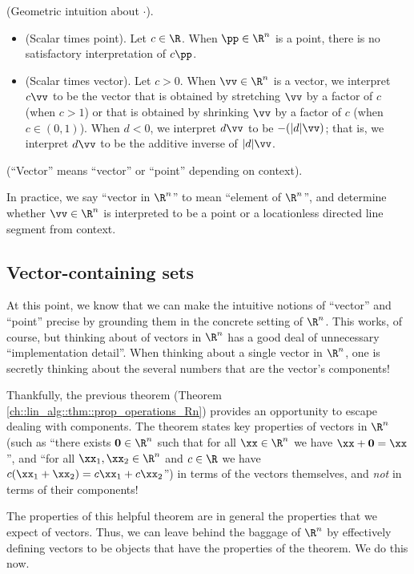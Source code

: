 \begin{remark}
    (Geometric intuition about $\cdot$).
    \begin{itemize}
        \item (Scalar times point). Let $c \in \R$. When $\pp \in \R^n$ is a point, there is no satisfactory interpretation of $c \pp$.
        \item (Scalar times vector). Let $c > 0$. When $\vv \in \R^n$ is a vector, we interpret $c \vv$ to be the vector that is obtained by stretching $\vv$ by a factor of $c$ (when $c > 1$) or that is obtained by shrinking $\vv$ by a factor of $c$ (when $c \in (0, 1)$). When $d < 0$, we interpret $d\vv$ to be $-(|d|\vv)$; that is, we interpret $d\vv$ to be the additive inverse of $|d|\vv$.
    \end{itemize}
\end{remark}

\begin{defn}
    (``Vector'' means ``vector'' or ``point'' depending on context).
    
    In practice, we say ``vector in $\R^n$'' to mean ``element of $\R^n$'', and determine whether $\vv \in \R^n$ is interpreted to be a point or a locationless directed line segment from context.
\end{defn}

\newpage

\subsection*{Vector-containing sets}

At this point, we know that we can make the intuitive notions of ``vector'' and ``point'' precise by grounding them in the concrete setting of $\R^n$. This works, of course, but thinking about of vectors in $\R^n$ has a good deal of unnecessary ``implementation detail''. When thinking about a single vector in $\R^n$, one is secretly thinking about the several numbers that are the vector's components!

Thankfully, the previous theorem (Theorem \ref{ch::lin_alg::thm::prop_operations_Rn}) provides an opportunity to escape dealing with components. The theorem states key properties of vectors in $\R^n$ (such as ``there exists $\mathbf{0} \in \R^n$ such that for all $\xx \in \R^n$ we have $\xx + \mathbf{0} = \xx$'', and ``for all $\xx_1, \xx_2 \in \R^n$ and $c \in \R$ we have $c(\xx_1 + \xx_2) = c\xx_1 + c\xx_2$'') in terms of the vectors themselves, and \textit{not} in terms of their components!

The properties of this helpful theorem are in general the properties that we expect of vectors. Thus, we can leave behind the baggage of $\R^n$ by effectively defining vectors to be objects that have the properties of the theorem. We do this now.

